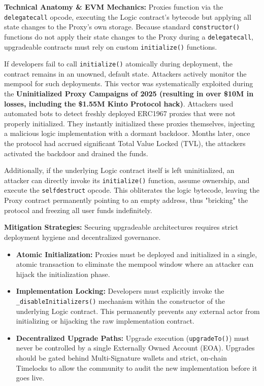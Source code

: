 \textbf{Technical Anatomy \& EVM Mechanics:} Proxies function via the \texttt{delegatecall} opcode, executing the Logic contract's bytecode but applying all state changes to the Proxy's own storage. Because standard \texttt{constructor()} functions do not apply their state changes to the Proxy during a \texttt{delegatecall}, upgradeable contracts must rely on custom \texttt{initialize()} functions.

If developers fail to call \texttt{initialize()} atomically during deployment, the contract remains in an unowned, default state. Attackers actively monitor the mempool for such deployments. This vector was systematically exploited during the \textbf{Uninitialized Proxy Campaigns of 2025 (resulting in over \$10M in losses, including the \$1.55M Kinto Protocol hack)}. Attackers used automated bots to detect freshly deployed ERC1967 proxies that were not properly initialized. They instantly initialized these proxies themselves, injecting a malicious logic implementation with a dormant backdoor. Months later, once the protocol had accrued significant Total Value Locked (TVL), the attackers activated the backdoor and drained the funds. 

Additionally, if the underlying Logic contract itself is left uninitialized, an attacker can directly invoke its \texttt{initialize()} function, assume ownership, and execute the \texttt{selfdestruct} opcode. This obliterates the logic bytecode, leaving the Proxy contract permanently pointing to an empty address, thus "bricking" the protocol and freezing all user funds indefinitely.

\textbf{Mitigation Strategies:} Securing upgradeable architectures requires strict deployment hygiene and decentralized governance.
\begin{itemize}
    \item \textbf{Atomic Initialization:} Proxies must be deployed and initialized in a single, atomic transaction to eliminate the mempool window where an attacker can hijack the initialization phase.
    \item \textbf{Implementation Locking:} Developers must explicitly invoke the \texttt{\_disableInitializers()} mechanism within the constructor of the underlying Logic contract. This permanently prevents any external actor from initializing or hijacking the raw implementation contract.
    \item \textbf{Decentralized Upgrade Paths:} Upgrade execution (\texttt{upgradeTo()}) must never be controlled by a single Externally Owned Account (EOA). Upgrades should be gated behind Multi-Signature wallets and strict, on-chain Timelocks to allow the community to audit the new implementation before it goes live.
\end{itemize}


